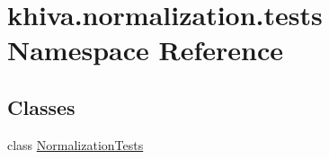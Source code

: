 \hypertarget{namespacekhiva_1_1normalization_1_1tests}{}\section{khiva.\+normalization.\+tests Namespace Reference}
\label{namespacekhiva_1_1normalization_1_1tests}
\subsection*{Classes}
\begin{DoxyCompactItemize}
\item 
class \mbox{\hyperlink{classkhiva_1_1normalization_1_1tests_1_1_normalization_tests}{Normalization\+Tests}}
\end{DoxyCompactItemize}
